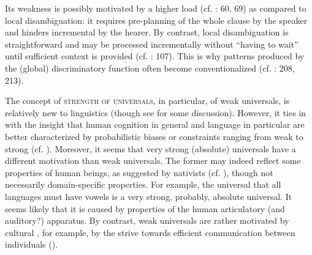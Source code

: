 \documentclass[output=paper]{langsci/langscibook}
\begin{document}
Its weakness is possibly motivated by a higher  load (cf. \citealt{Hawkins2014_CompMot}: 60, 69) as compared to local disambiguation: it requires pre-planning of the whole clause by the speaker and hinders incremental  by the hearer. By contrast, local disambiguation is straightforward and may be processed incrementally without “having to wait” until sufficient context is provided (cf. \citealt{Bornkessel-SchlesewskySchlesewsky2014}: 107). This is why patterns produced by the (global) discriminatory function often become conventionalized (cf. \citealt{Aissen2003,ZeevatJäger2002,Jäger2004,Malchukov2008}: 208, 213).

The concept of \textsc{strength of universals}, in particular, of weak universals, is relatively new to linguistics (though see \citealt{Bickel2013} for some discussion). However, it ties in with the insight that human cognition in general and language  in particular are better characterized by probabilistic biases or constraints ranging from weak to strong (cf. \citealt{ThompsonEtAl2016}). Moreover, it seems that very strong (absolute) universals have a different motivation than weak universals. The former may indeed reflect some  properties of human beings, as suggested by nativists (cf. \citealt{Chomsky1965}), though not necessarily domain-specific properties. For example, the universal that all languages must have vowels \citep[19]{Comrie1989} is a very strong, probably, absolute universal. It seems likely that it is caused by  properties of the human articulatory (and auditory?) apparatus. By contrast, weak universals are rather motivated by cultural , for example, by the strive towards efficient communication between individuals (). 
\end{document}

